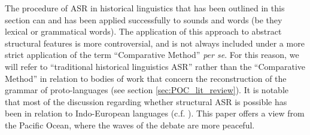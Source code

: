 \documentclass[12pt,letterpaper]{article}
\begin{document}
The procedure of ASR in historical linguistics that has been outlined in this section can and has been applied successfully to sounds and words (be they lexical or grammatical words). The application of this approach to abstract structural features is more controversial, and is not always included under a more strict application of the term ``Comparative Method'' \emph{per se}. For this reason, we will refer to ``traditional historical linguistics ASR'' rather than the ``Comparative Method'' in relation to bodies of work that concern the reconstruction of the grammar of proto-languages (see section \ref{sec:POC_lit_review}). It is notable that most of the discussion regarding whether structural ASR is possible has been in relation to Indo-European languages (c.f. \cite{walkden_2013}). This paper offers a view from the Pacific Ocean, where the waves of the debate are more peaceful.








\end{document}
